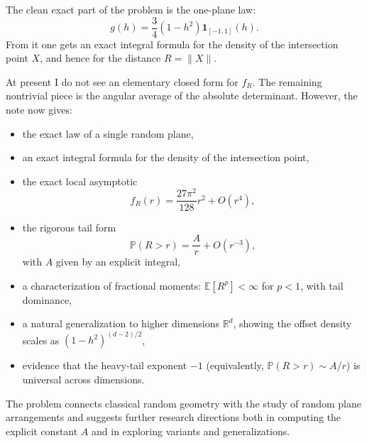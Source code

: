 \documentclass[11pt]{article}
\begin{document}
The clean exact part of the problem is the one-plane law:
\[
g(h)=\frac{3}{4}(1-h^2)\mathbf{1}_{[-1,1]}(h).
\]
From it one gets an exact integral formula for the density of the intersection point $X$, and hence
for the distance $R=\|X\|$.

At present I do not see an elementary closed form for $f_R$. The remaining nontrivial piece is the
angular average of the absolute determinant. However, the note now gives:

\begin{itemize}
\item the exact law of a single random plane,
\item an exact integral formula for the density of the intersection point,
\item the exact local asymptotic
\[
f_R(r)=\frac{27\pi^2}{128}r^2+O(r^4),
\]
\item the rigorous tail form
\[
\mathbb{P}(R>r)=\frac{A}{r}+O(r^{-3}),
\]
with $A$ given by an explicit integral,
\item a characterization of fractional moments: $\mathbb{E}[R^p] < \infty$ for $p < 1$, with
tail dominance,
\item a natural generalization to higher dimensions $\mathbb{R}^d$, showing the offset density
scales as $(1-h^2)^{(d-2)/2}$,
\item evidence that the heavy-tail exponent $-1$ (equivalently, $\mathbb{P}(R>r) \sim A/r$) is
universal across dimensions.
\end{itemize}

\noindent
The problem connects classical random geometry with the study of random plane arrangements and
suggests further research directions both in computing the explicit constant $A$ and in exploring
variants and generalizations.
\end{document}
